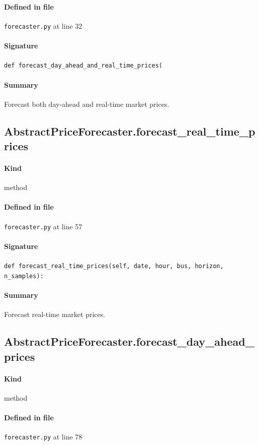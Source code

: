 \documentclass[11pt]{report}
\begin{document}
\paragraph{Defined in file} \texttt{forecaster.py} at line 32
\paragraph{Signature} \texttt{def forecast\_day\_ahead\_and\_real\_time\_prices(}
\paragraph{Summary} Forecast both day-ahead and real-time market prices.
\subsection{AbstractPriceForecaster.forecast\_real\_time\_prices}
\label{def:forecaster.py:AbstractPriceForecaster.forecast_real_time_prices:L57}
\paragraph{Kind} method
\paragraph{Defined in file} \texttt{forecaster.py} at line 57
\paragraph{Signature} \texttt{def forecast\_real\_time\_prices(self, date, hour, bus, horizon, n\_samples):}
\paragraph{Summary} Forecast real-time market prices.
\subsection{AbstractPriceForecaster.forecast\_day\_ahead\_prices}
\label{def:forecaster.py:AbstractPriceForecaster.forecast_day_ahead_prices:L78}
\paragraph{Kind} method
\paragraph{Defined in file} \texttt{forecaster.py} at line 78
\end{document}
